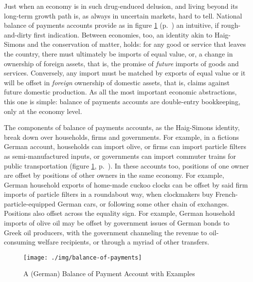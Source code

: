 \documentclass[11pt,a4paper,oneside]{article}
\begin{document}
Just when an economy is in such drug-enduced delusion, and living beyond its long-term growth path is, as always in uncertain markets, hard to tell. 
National balance of payments accounts provide as in figure \ref{fig:balance-of-payments} (p.~\pageref{fig:balance-of-payments}) an intuitive, if rough-and-dirty first indication. 
Between economies, too, an identity akin to Haig-Simons and the conservation of matter, holds: 
for any good or service that leaves the country, there must ultimately be imports of equal value, or, a change in ownership of foreign assets, that is, the promise of \emph{future} imports of goods and services. 
Conversely, any import must be matched by exports of equal value or it will be offset in \emph{foreign} ownership of domestic assets, that is, claims against future domestic production. 
As all the most important economic abstractions, this one is simple: 
balance of payments accounts are double-entry bookkeeping, only at the economy level.  

The components of balance of payments accounts, as the Haig-Simons identity, break down over households, firms and governments. 
For example, in a fictions German account, households can import olive, or firms can import particle filters as semi-manufactured inputs, or governments can import commuter trains for public transportation (figure \ref{fig:balance-of-payments}, p.~\pageref{fig:balance-of-payments}). 
In these accounts too, positions of one owner are offset by positions of other owners in the same economy. 
For example, German household exports of home-made cuckoo clocks can be offset by said firm imports of particle filters in a roundabout way, when clockmakers buy French-particle-equipped German cars, or following some other chain of exchanges. 
Positions  also offset across the equality sign. 
For example, German household imports of olive oil may be offset by government issues of German bonds to Greek oil producers, with the government channeling the revenue to oil-consuming welfare recipients, or through a myriad of other transfers.

\begin{figure}[htbp]
	\begin{center}
	\texttt{[image: ./img/balance-of-payments]}  
	\caption{A (German) Balance of Payment Account with Examples}
	\label{fig:balance-of-payments}
	\end{center}
\end{figure}
\end{document}
